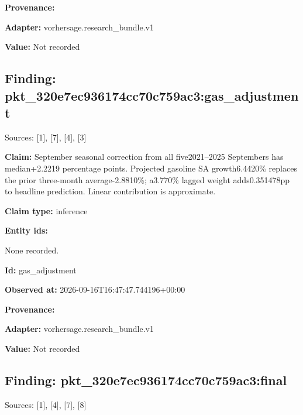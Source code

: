 \documentclass[11pt]{article}
\begin{document}
\par\noindent\textbf{Provenance:} \par \par\noindent\textbf{Adapter:} vorhersage.r\hspace{0pt}esearch\_bund\hspace{0pt}le.v1

\par\noindent\textbf{Value:} Not recorded

\subsection*{\textcolor{epdarkgreen}{Finding: pkt\_320e7ec9\hspace{0pt}36174cc70c75\hspace{0pt}9ac3:gas\_adj\hspace{0pt}ustment}}
Sources: [1], [7], [4], [3]


\par\noindent\textbf{Claim:} September seasonal correction from all five2021–2025 Septembers has median+2.2219 percentage points. Projected gasoline SA growth6.4420\% replaces the prior three-month average-2.8810\%; a3.770\% lagged weight adds0.351478pp to headline prediction. Linear contribution is approximate.

\par\noindent\textbf{Claim type:} inference

\par\noindent\textbf{Entity ids:} \par None recorded.

\par\noindent\textbf{Id:} gas\_adjustment

\par\noindent\textbf{Observed at:} 2026-09-16T1\hspace{0pt}6:47:47.7441\hspace{0pt}96+00:00

\par\noindent\textbf{Provenance:} \par \par\noindent\textbf{Adapter:} vorhersage.r\hspace{0pt}esearch\_bund\hspace{0pt}le.v1

\par\noindent\textbf{Value:} Not recorded

\subsection*{\textcolor{epdarkgreen}{Finding: pkt\_320e7ec9\hspace{0pt}36174cc70c75\hspace{0pt}9ac3:final}}
Sources: [1], [4], [7], [8]
\end{document}
